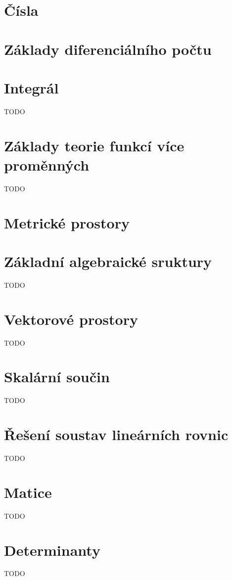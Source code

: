 


\section{Čísla}


\section{Základy diferenciálního počtu}


\section{Integrál}
TODO

\section{Základy teorie funkcí více proměnných}
TODO

\section{Metrické prostory}


\section{Základní algebraické sruktury}
TODO

\section{Vektorové prostory}
TODO

\section{Skalární součin}
TODO

\section{Řešení soustav lineárních rovnic}
TODO

\section{Matice}
TODO

\section{Determinanty}
TODO


